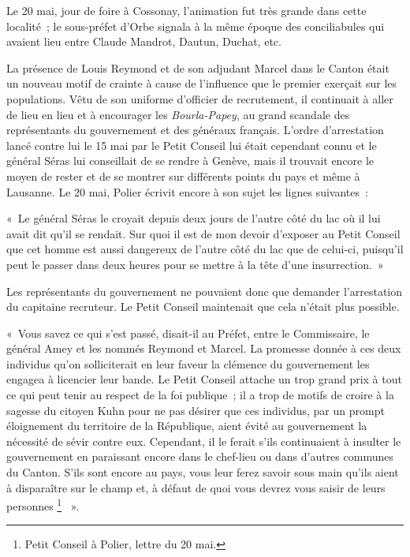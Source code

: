 \documentclass[french,twoside]{book} %
\newenvironment{quoteblock}%
  {\begin{quoting}}
  {\end{quoting}}
\newenvironment{quotebar}{%
    \def\FrameCommand{{\color{rubric!10!}\vrule width 0.5em} \hspace{0.9em}}%
    \def\OuterFrameSep{\itemsep} %
    \MakeFramed {\advance\hsize-\width \FrameRestore}
  }%
  {%
    \endMakeFramed
  }
\renewenvironment{quoteblock}%
  {%
    \savenotes
    \setstretch{0.9}
    \normalfont
    \begin{quotebar}
  }
  {%
    \end{quotebar}
    \spewnotes
  }
\begin{document}
\noindent Le 20 mai, jour de foire à Cossonay, l’animation fut très grande dans cette localité ; le sous-préfet d’Orbe signala à la même époque des conciliabules qui avaient lieu entre Claude Mandrot, Dautun, Duchat, etc.\par
La présence de Louis Reymond et de son adjudant Marcel dans le Canton était un nouveau motif de crainte à cause de l’influence que le premier exerçait sur les populations. Vêtu de son uniforme d’officier de recrutement, il continuait à aller de lieu en lieu et à encourager les \emph{Bourla-Papey}, au grand scandale des représentants du gouvernement et des généraux français. L’ordre d’arrestation lancé contre lui le 15 mai par le Petit Conseil lui était cependant connu et le général Séras lui conseillait de se rendre à Genève, mais il trouvait encore le moyen de rester et de se montrer sur différents points du pays et même à Lausanne. Le 20 mai, Polier écrivit encore à son sujet les lignes suivantes :\par

\begin{quoteblock}
 \noindent « Le général Séras le croyait depuis deux jours de l’autre côté du lac où il lui avait dit qu’il se rendait. Sur quoi il est de mon devoir d’exposer au Petit Conseil que cet homme est aussi dangereux de l’autre côté du lac que de celui-ci, puisqu’il peut le passer dans deux heures pour se mettre à la tête d’une insurrection. »
 \end{quoteblock}

\noindent Les représentants du gouvernement ne pouvaient donc que demander l’arrestation du capitaine recruteur. Le Petit Conseil maintenait que cela n’était plus possible.\par

\begin{quoteblock}
 \noindent « Vous savez ce qui s’est passé, disait-il au Préfet, entre le Commissaire, le général Amey et les nommés Reymond et Marcel. La promesse donnée à ces deux individus qu’on solliciterait en leur faveur la clémence du gouvernement les engagea à licencier leur bande. Le Petit Conseil attache un trop grand prix à tout ce qui peut tenir au respect de la foi publique ; il a trop de motifs de croire à la sagesse du citoyen Kuhn pour ne pas désirer que ces individus, par un prompt éloignement du territoire de la République, aient évité au gouvernement la nécessité de sévir contre eux. Cependant, il le ferait s’ils continuaient à insulter le gouvernement en paraissant encore dans le chef-lieu ou dans d’autres communes du Canton. S’ils sont encore au pays, vous leur ferez savoir sous main qu’ils aient à disparaître sur le champ et, à défaut de quoi vous devrez vous saisir de leurs personnes \footnote{Petit Conseil à Polier, lettre du 20 mai.}  ».
 \end{quoteblock}
\end{document}

